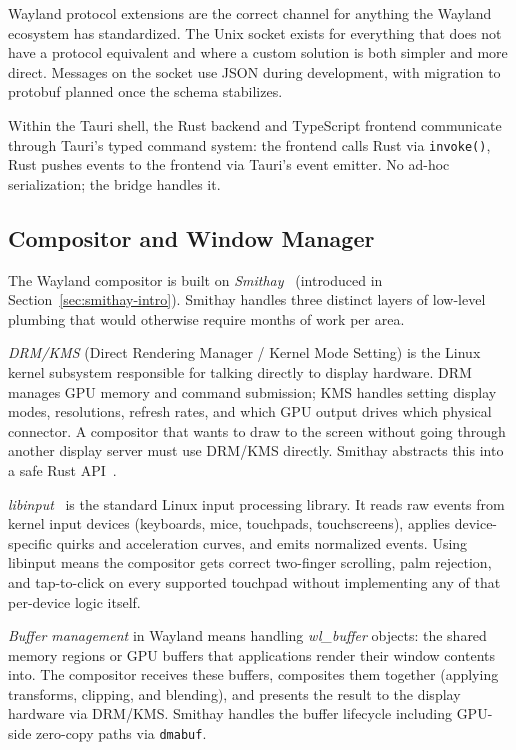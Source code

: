 Wayland protocol extensions are the correct channel for anything the Wayland
ecosystem has standardized. The Unix socket exists for everything that does not
have a protocol equivalent and where a custom solution is both simpler and more
direct. Messages on the socket use JSON during development, with migration to
protobuf planned once the schema stabilizes.

Within the Tauri shell, the Rust backend and TypeScript frontend communicate
through Tauri's typed command system: the frontend calls Rust via
\texttt{invoke()}, Rust pushes events to the frontend via Tauri's event
emitter. No ad-hoc serialization; the bridge handles it.

\subsection{Compositor and Window Manager}
\label{sec:compositor}

The Wayland compositor is built on \emph{Smithay}~\cite{smithay} (introduced
in Section~\ref{sec:smithay-intro}). Smithay handles three distinct layers of
low-level plumbing that would otherwise require months of work per area.

\emph{DRM/KMS} (Direct Rendering Manager / Kernel Mode Setting) is the Linux
kernel subsystem responsible for talking directly to display hardware. DRM
manages GPU memory and command submission; KMS handles setting display modes,
resolutions, refresh rates, and which GPU output drives which physical
connector. A compositor that wants to draw to the screen without going through
another display server must use DRM/KMS directly. Smithay abstracts this into
a safe Rust API~\cite{archwiki:drm}.

\emph{libinput}~\cite{libinput} is the standard Linux input processing library.
It reads raw events from kernel input devices (keyboards, mice, touchpads,
touchscreens), applies device-specific quirks and acceleration curves, and
emits normalized events. Using libinput means the compositor gets correct
two-finger scrolling, palm rejection, and tap-to-click on every supported
touchpad without implementing any of that per-device logic itself.

\emph{Buffer management} in Wayland means handling \emph{wl\_buffer} objects:
the shared memory regions or GPU buffers that applications render their window
contents into. The compositor receives these buffers, composites them together
(applying transforms, clipping, and blending), and presents the result to the
display hardware via DRM/KMS. Smithay handles the buffer lifecycle including
GPU-side zero-copy paths via \texttt{dmabuf}.

